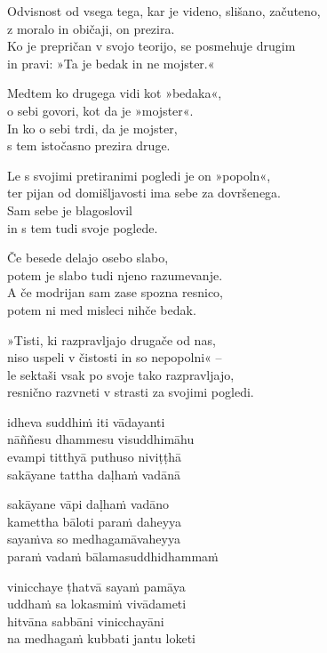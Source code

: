 
\clearpage

Odvisnost od vsega tega, kar je videno, slišano, začuteno,\\
z moralo in običaji, on prezira.\\
Ko je prepričan v svojo teorijo, se posmehuje drugim\\
in pravi: »Ta je bedak in ne mojster.«

Medtem ko drugega vidi kot »bedaka«,\\
o sebi govori, kot da je »mojster«.\\
In ko o sebi trdi, da je mojster,\\
s tem istočasno prezira druge.

Le s svojimi pretiranimi pogledi je on »popoln«,\\
ter pijan od domišljavosti ima sebe za dovršenega.\\
Sam sebe je blagoslovil\\
in s tem tudi svoje poglede.

Če besede delajo osebo slabo,\\
potem je slabo tudi njeno razumevanje.\\
A če modrijan sam zase spozna resnico,\\
potem ni med misleci nihče bedak.

»Tisti, ki razpravljajo drugače od nas,\\
niso uspeli v čistosti in so nepopolni« --\\
le sektaši vsak po svoje tako razpravljajo,\\
resnično razvneti v strasti za svojimi pogledi.


\clearpage

idheva suddhiṁ iti vādayanti\\
nāññesu dhammesu visuddhimāhu\\
evampi titthyā puthuso niviṭṭhā\\
sakāyane tattha daḷhaṁ vadānā

sakāyane vāpi daḷhaṁ vadāno\\
kamettha bāloti paraṁ daheyya\\
sayaṁva so medhagamāvaheyya\\
paraṁ vadaṁ bālamasuddhidhammaṁ

vinicchaye ṭhatvā sayaṁ pamāya\\
uddhaṁ sa lokasmiṁ vivādameti\\
hitvāna sabbāni vinicchayāni\\
na medhagaṁ kubbati jantu loketi

